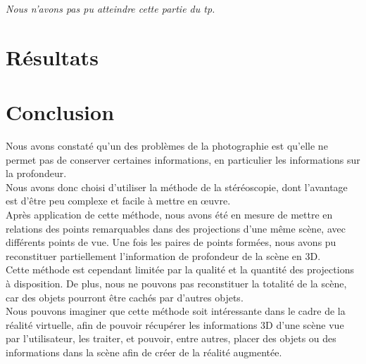 \documentclass[a4paper]{article}
\begin{document}
{\em Nous n'avons pas pu atteindre cette partie du tp.}

\clearpage

\section{Résultats}

\clearpage


\section{Conclusion}

Nous avons constaté qu'un des problèmes de la photographie est qu'elle ne permet pas de conserver certaines informations, en particulier les informations sur la profondeur.\\

Nous avons donc choisi d'utiliser la méthode de la stéréoscopie, dont l'avantage est d'être peu complexe et facile à mettre en œuvre.\\

Après application de cette méthode, nous avons été en mesure de mettre en relations des points remarquables dans des projections d'une même scène, avec différents points de vue. Une fois les paires de points formées, nous avons pu reconstituer partiellement l'information de profondeur de la scène en 3D.\\

Cette méthode est cependant limitée par la qualité et la quantité des projections à disposition. De plus, nous ne pouvons pas reconstituer la totalité de la scène, car des objets pourront être cachés par d'autres objets.\\

Nous pouvons imaginer que cette méthode soit intéressante dans le cadre de la réalité virtuelle, afin de pouvoir récupérer les informations 3D d'une scène vue par l'utilisateur, les traiter, et pouvoir, entre autres, placer des objets ou des informations dans la scène afin de créer de la réalité augmentée.\\

\clearpage
\end{document}
